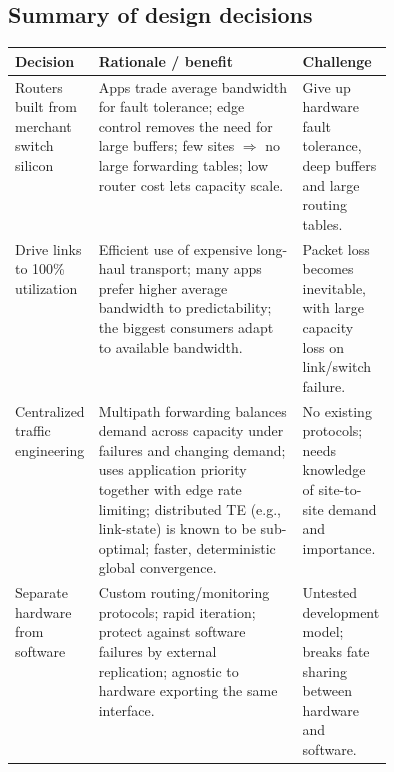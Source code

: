 \subsection{Summary of design decisions}
\begin{center}
\small
\begin{tabularx}{\linewidth}{@{}>{\raggedright}p{0.2\linewidth} X >{\raggedright\arraybackslash}p{0.24\linewidth}@{}}
\toprule
\textbf{Decision} & \textbf{Rationale / benefit} & \textbf{Challenge} \\
\midrule
Routers built from merchant switch silicon & Apps trade average bandwidth for fault tolerance; edge control removes the need for large buffers; few sites $\Rightarrow$ no large forwarding tables; low router cost lets capacity scale. & Give up hardware fault tolerance, deep buffers and large routing tables. \\
Drive links to 100\% utilization & Efficient use of expensive long-haul transport; many apps prefer higher average bandwidth to predictability; the biggest consumers adapt to available bandwidth. & Packet loss becomes inevitable, with large capacity loss on link/switch failure. \\
Centralized traffic engineering & Multipath forwarding balances demand across capacity under failures and changing demand; uses application priority together with edge rate limiting; distributed TE (e.g., link-state) is known to be sub-optimal; faster, deterministic global convergence. & No existing protocols; needs knowledge of site-to-site demand and importance. \\
Separate hardware from software & Custom routing/monitoring protocols; rapid iteration; protect against software failures by external replication; agnostic to hardware exporting the same interface. & Untested development model; breaks fate sharing between hardware and software. \\
\bottomrule
\end{tabularx}
\end{center}

